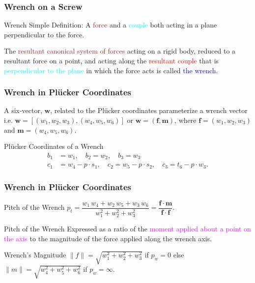 \begin{frame}
	\frametitle{Wrench on a Screw}
	\begin{block}{Wrench}
		Simple Definition: A \textcolor{brown}{force} and a \textcolor{cyan}{couple} both acting in a plane perpendicular to the force.
	\end{block}
	\begin{definition}		
		The \textcolor{brown}{resultant canonical system of forces} acting on a rigid body, \textcolor{light-blue}{reduced to a resultant force on a point}, and acting along the \textcolor{red}{resultant couple} that is \textcolor{cyan}{perpendicular to the plane} in which the force acts is called \textcolor{blue}{the wrench}.
	\end{definition}
\end{frame}

\begin{frame}
	\frametitle{Wrench in Pl{\"u}cker Coordinates}
	\begin{definition}
		A six-vector, $\bm{w}$, related to the Pl{\"u}cker coordinates  parameterize a wrench vector i.e. $\bm{w}=\left[(w_1, w_2, w_3), (w_4, w_5, w_6)\right]$ or $\bm{w}=\left(\bm{f}, \bm{m}\right)$, where $\bm{f}=(w_1, w_2, w_3)$ and $\bm{m}=(w_4, w_5, w_6)$.
	\end{definition}
	\begin{block}{Pl{\"u}cker Coordinates of a Wrench}
		\begin{align}
			b_1 &= w_1, \quad b_2 = w_2, \quad b_3 = w_3 \\
			c_1 &= w_4 - p \cdot s_1, \quad c_2 = w_5-p\cdot s_2, \quad c_3 = t_6 - p\cdot w_3.
		\end{align}
	\end{block}
\end{frame}

\begin{frame}
	\frametitle{Wrench in Pl{\"u}cker Coordinates}
	\begin{block}{Pitch of the Wrench}
		$p_t = \dfrac{w_1\,w_4 + w_2 \, w_5 + w_3\,w_6}{w_1^2+w_2^2+w_3^2}=\dfrac{\bm{f}\cdot \bm{m}}{\bm{f}\cdot \bm{f}}$.
	\end{block}
	\begin{block}{Pitch of the Wrench}
		Expressed as a ratio of the \textcolor{magenta}{moment applied about a point on the axis} to the \textcolor{light-blue}{magnitude of the force applied}  along the wrench axis. 
	\end{block}	
	\begin{block}{Wrench's Magnitude}
		$\|f\| = \sqrt{w_1^2 + w_2^2 + w_3^2}$ if $p_w = 0$ else $\|m\| = \sqrt{w_4^2 + w_5^2 + w_6^2}$ if $p_w = \infty$.
	\end{block}	
\end{frame}

